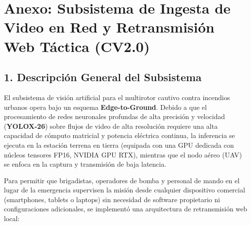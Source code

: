 \documentclass[11pt,a4paper]{article}
\begin{document}
\section*{Anexo: Subsistema de Ingesta de Video en Red y Retransmisión Web Táctica (CV2.0)}

\subsection*{1. Descripción General del Subsistema}

El subsistema de visión artificial para el multirotor cautivo contra incendios urbanos opera bajo un esquema \textbf{Edge-to-Ground}. Debido a que el procesamiento de redes neuronales profundas de alta precisión y velocidad (\textbf{YOLOX-26}) sobre flujos de video de alta resolución requiere una alta capacidad de cómputo matricial y potencia eléctrica continua, la inferencia se ejecuta en la estación terrena en tierra (equipada con una GPU dedicada con núcleos tensores FP16, NVIDIA GPU RTX), mientras que el nodo aéreo (UAV) se enfoca en la captura y transmisión de baja latencia.

Para permitir que brigadistas, operadores de bomba y personal de mando en el lugar de la emergencia supervisen la misión desde cualquier dispositivo comercial (smartphones, tablets o laptops) sin necesidad de software propietario ni configuraciones adicionales, se implementó una arquitectura de retransmisión web local:
\end{document}
